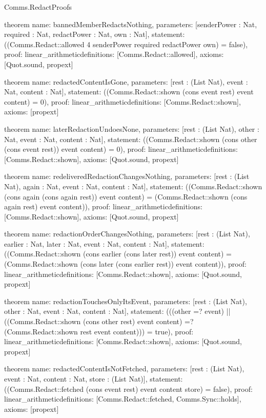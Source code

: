\begin{lexlean}{Comms.RedactProofs}
\begin{semanticmodule}
theorem{
  name: bannedMemberRedactsNothing,
  parameters: [senderPower : Nat, required : Nat, redactPower : Nat, own : Nat],
  statement: ((Comms.Redact::allowed 4 senderPower required redactPower own) = false),
  proof: linear_arithmetic{definitions: [Comms.Redact::allowed]},
  axioms: [Quot.sound, propext]
}

theorem{
  name: redactedContentIsGone,
  parameters: [rest : (List Nat), event : Nat, content : Nat],
  statement: ((Comms.Redact::shown (cons event rest) event content) = 0),
  proof: linear_arithmetic{definitions: [Comms.Redact::shown]},
  axioms: [propext]
}

theorem{
  name: laterRedactionUndoesNone,
  parameters: [rest : (List Nat), other : Nat, event : Nat, content : Nat],
  statement: ((Comms.Redact::shown (cons other (cons event rest)) event content) = 0),
  proof: linear_arithmetic{definitions: [Comms.Redact::shown]},
  axioms: [Quot.sound, propext]
}

theorem{
  name: redeliveredRedactionChangesNothing,
  parameters: [rest : (List Nat), again : Nat, event : Nat, content : Nat],
  statement: ((Comms.Redact::shown (cons again (cons again rest)) event content) = (Comms.Redact::shown (cons again rest) event content)),
  proof: linear_arithmetic{definitions: [Comms.Redact::shown]},
  axioms: [Quot.sound, propext]
}

theorem{
  name: redactionOrderChangesNothing,
  parameters: [rest : (List Nat), earlier : Nat, later : Nat, event : Nat, content : Nat],
  statement: ((Comms.Redact::shown (cons earlier (cons later rest)) event content) = (Comms.Redact::shown (cons later (cons earlier rest)) event content)),
  proof: linear_arithmetic{definitions: [Comms.Redact::shown]},
  axioms: [Quot.sound, propext]
}

theorem{
  name: redactionTouchesOnlyItsEvent,
  parameters: [rest : (List Nat), other : Nat, event : Nat, content : Nat],
  statement: (((other =? event) || ((Comms.Redact::shown (cons other rest) event content) =? (Comms.Redact::shown rest event content))) = true),
  proof: linear_arithmetic{definitions: [Comms.Redact::shown]},
  axioms: [Quot.sound, propext]
}

theorem{
  name: redactedContentIsNotFetched,
  parameters: [rest : (List Nat), event : Nat, content : Nat, store : (List Nat)],
  statement: ((Comms.Redact::fetched (cons event rest) event content store) = false),
  proof: linear_arithmetic{definitions: [Comms.Redact::fetched, Comms.Sync::holds]},
  axioms: [propext]
}


\end{semanticmodule}
\end{lexlean}

